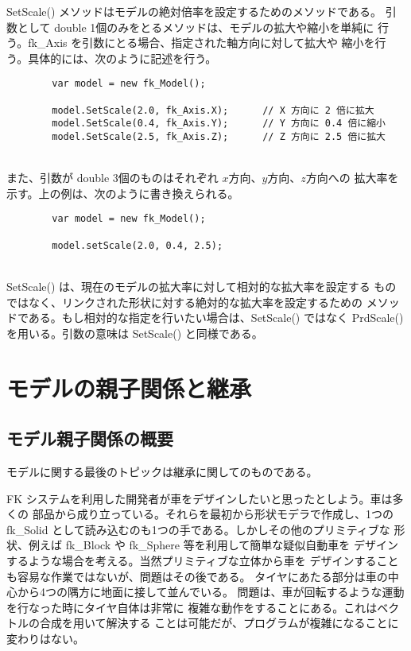 SetScale() メソッドはモデルの絶対倍率を設定するためのメソッドである。
引数として double 1個のみをとるメソッドは、モデルの拡大や縮小を単純に
行う。fk\_Axis を引数にとる場合、指定された軸方向に対して拡大や
縮小を行う。具体的には、次のように記述を行う。
\\
\begin{breakbox}
\begin{verbatim}
        var model = new fk_Model();

        model.SetScale(2.0, fk_Axis.X);      // X 方向に 2 倍に拡大
        model.SetScale(0.4, fk_Axis.Y);      // Y 方向に 0.4 倍に縮小
        model.SetScale(2.5, fk_Axis.Z);      // Z 方向に 2.5 倍に拡大
\end{verbatim}
\end{breakbox}
~ \\
また、引数が double 3個のものはそれぞれ \(x\)方向、\(y\)方向、\(z\)方向への
拡大率を示す。上の例は、次のように書き換えられる。
\\
\begin{screen}
\begin{verbatim}
        var model = new fk_Model();

        model.setScale(2.0, 0.4, 2.5);
\end{verbatim}
\end{screen}
~ \\
SetScale() は、現在のモデルの拡大率に対して相対的な拡大率を設定する
ものではなく、リンクされた形状に対する絶対的な拡大率を設定するための
メソッドである。もし相対的な指定を行いたい場合は、SetScale() ではなく
PrdScale() を用いる。引数の意味は SetScale() と同様である。

\section{モデルの親子関係と継承}
\subsection{モデル親子関係の概要}
モデルに関する最後のトピックは継承に関してのものである。

FK システムを利用した開発者が車をデザインしたいと思ったとしよう。車は多くの
部品から成り立っている。それらを最初から形状モデラで作成し、1つの
fk\_Solid として読み込むのも1つの手である。しかしその他のプリミティブな
形状、例えば fk\_Block や fk\_Sphere 等を利用して簡単な疑似自動車を
デザインするような場合を考える。当然プリミティブな立体から車を
デザインすることも容易な作業ではないが、問題はその後である。
タイヤにあたる部分は車の中心から4つの隅方に地面に接して並んでいる。
問題は、車が回転するような運動を行なった時にタイヤ自体は非常に
複雑な動作をすることにある。これはベクトルの合成を用いて解決する
ことは可能だが、プログラムが複雑になることに変わりはない。

